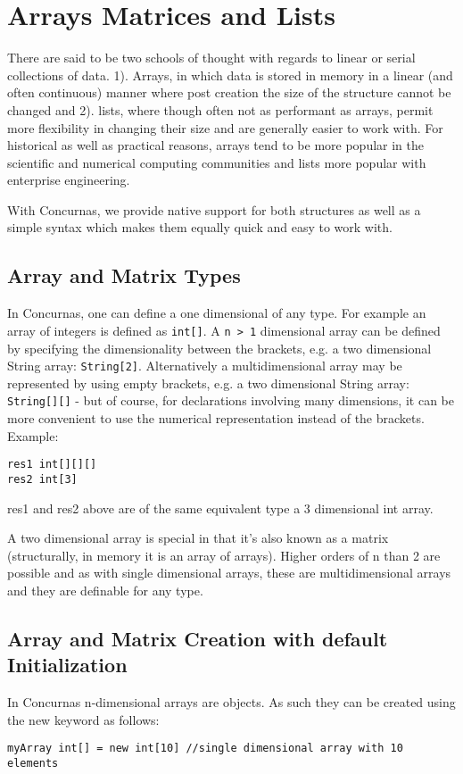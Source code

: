 \documentclass[conc-doc]{subfiles}
\begin{document}
	
	\chapter[Arrays Matrices and Lists]{Arrays Matrices and Lists}
	\label{ch:arrays}
There are said to be two schools of thought with regards to linear or serial collections of data. 1). Arrays, in which data is stored in memory in a linear (and often continuous) manner where post creation the size of the structure cannot be changed and 2). lists, where though often not as performant as arrays, permit more flexibility in changing their size and are generally easier to work with. For historical as well as practical reasons, arrays tend to be more popular in the scientific and numerical computing communities and lists more popular with enterprise engineering.

With Concurnas, we provide native support for both structures as well as a simple syntax which makes them equally quick and easy to work with.

\section{Array and Matrix Types}
In Concurnas, one can define a one dimensional of any type. For example an array of integers is defined as \lstinline{int[]}. A \lstinline{n > 1} dimensional array can be defined by specifying the dimensionality between the brackets, e.g. a two dimensional String array: \lstinline{String[2]}. Alternatively a multidimensional array may be represented by using empty brackets, e.g. a two dimensional String array: \lstinline{String[][]} - but of course, for declarations involving many dimensions, it can be more convenient to use the numerical representation instead of the brackets.  Example:

\begin{lstlisting}
res1 int[][][]
res2 int[3]
\end{lstlisting}

res1 and res2 above are of the same equivalent type a 3 dimensional int array.

A two dimensional array is special in that it's also known as a matrix (structurally, in memory it is an array of arrays). Higher orders of n than 2 are possible and as with single dimensional arrays, these are multidimensional arrays and they are definable for any type.

\section{Array and Matrix Creation with default Initialization}
In Concurnas n-dimensional arrays are objects. As such they can be created using the new keyword as follows:
\begin{lstlisting}
myArray int[] = new int[10] //single dimensional array with 10 elements
\end{lstlisting}
\end{document}
